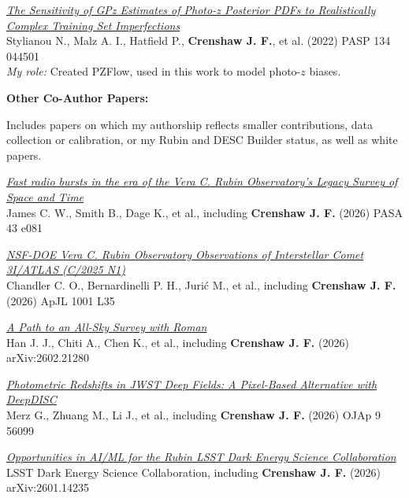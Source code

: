 \begin{etaremune}
\item \href{https://ui.adsabs.harvard.edu/abs/2022PASP..134d4501S}{\textit{The Sensitivity of GPz Estimates of Photo-z Posterior PDFs to Realistically Complex Training Set Imperfections}} \\
Stylianou N., Malz A. I., Hatfield P., \textbf{Crenshaw J. F.}, et al. (2022)
PASP 134 044501 \\
{\small \textit{My role:} Created PZFlow, used in this work to model photo-$z$ biases.}

\end{etaremune}

\textbf{Other Co-Author Papers:}

Includes papers on which my authorship reflects smaller contributions, data collection or calibration, or my Rubin and DESC Builder status, as well as white papers.

\begin{etaremune}
\item \href{https://ui.adsabs.harvard.edu/abs/2026PASA...43...81J}{\textit{Fast radio bursts in the era of the Vera C. Rubin Observatory's Legacy Survey of Space and Time}} \\
James C. W., Smith B., Dage K., et al., including \textbf{Crenshaw J. F.} (2026)
PASA 43 e081

\item \href{https://ui.adsabs.harvard.edu/abs/2026ApJ..1001L..35C}{\textit{NSF-DOE Vera C. Rubin Observatory Observations of Interstellar Comet 3I/ATLAS (C/2025 N1)}} \\
Chandler C. O., Bernardinelli P. H., Jurić M., et al., including \textbf{Crenshaw J. F.} (2026)
ApJL 1001 L35

\item \href{https://ui.adsabs.harvard.edu/abs/2026arXiv260221280H}{\textit{A Path to an All-Sky Survey with Roman}} \\
Han J. J., Chiti A., Chen K., et al., including \textbf{Crenshaw J. F.} (2026)
arXiv:2602.21280

\item \href{https://ui.adsabs.harvard.edu/abs/2026OJAp....956099M}{\textit{Photometric Redshifts in JWST Deep Fields: A Pixel-Based Alternative with DeepDISC}} \\
Merz G., Zhuang M., Li J., et al., including \textbf{Crenshaw J. F.} (2026)
OJAp 9 56099

\item \href{https://ui.adsabs.harvard.edu/abs/2026arXiv260114235L}{\textit{Opportunities in AI/ML for the Rubin LSST Dark Energy Science Collaboration}} \\
LSST Dark Energy Science Collaboration, including \textbf{Crenshaw J. F.} (2026)
arXiv:2601.14235

\end{etaremune}
\clearpage
